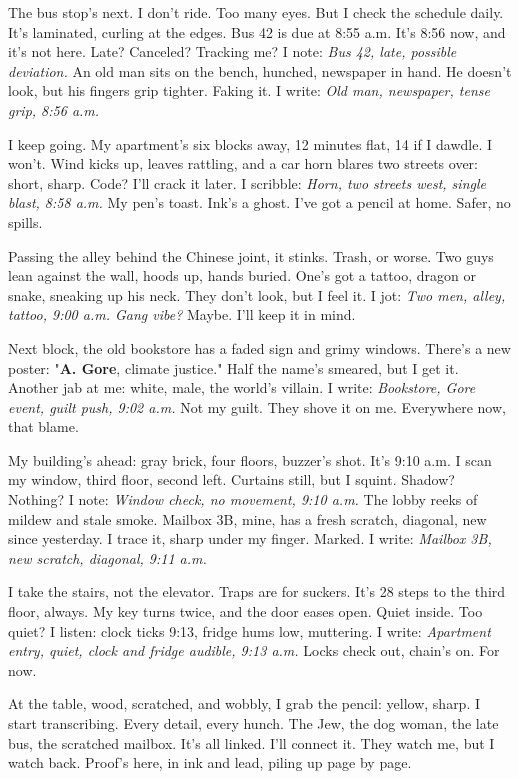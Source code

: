 \documentclass{article}
\begin{document}
The bus stop's next.  I don't ride. Too many eyes.  But I check the schedule daily. It's laminated, curling at the edges.  Bus 42 is due at 8:55 a.m. It's 8:56 now, and it's not here.  Late?  Canceled?  Tracking me? I note: \textit{Bus 42, late, possible deviation.} An old man sits on the bench, hunched, newspaper in hand. He doesn't look, but his fingers grip tighter. Faking it. I write: \textit{Old man, newspaper, tense grip, 8:56 a.m.}

I keep going. My apartment's six blocks away, 12 minutes flat, 14 if I dawdle. I won't. Wind kicks up, leaves rattling, and a car horn blares two streets over: short, sharp. Code? I'll crack it later. I scribble: \textit{Horn, two streets west, single blast, 8:58 a.m.} My pen's toast. Ink's a ghost. I've got a pencil at home. Safer, no spills.

Passing the alley behind the Chinese joint, it stinks. Trash, or worse. Two guys lean against the wall, hoods up, hands buried. One's got a tattoo, dragon or snake, sneaking up his neck. They don't look, but I feel it. I jot: \textit{Two men, alley, tattoo, 9:00 a.m. Gang vibe?} Maybe. I'll keep it in mind.

Next block, the old bookstore has a faded sign and grimy windows. There's a new poster: "\textbf{A. Gore}, climate justice." Half the name's smeared, but I get it. Another jab at me: white, male, the world's villain. I write: \textit{Bookstore, Gore event, guilt push, 9:02 a.m.} Not my guilt. They shove it on me. Everywhere now, that blame.

My building's ahead: gray brick, four floors, buzzer's shot. It's 9:10 a.m. I scan my window, third floor, second left. Curtains still, but I squint. Shadow? Nothing? I note: \textit{Window check, no movement, 9:10 a.m.} The lobby reeks of mildew and stale smoke. Mailbox 3B, mine, has a fresh scratch, diagonal, new since yesterday. I trace it, sharp under my finger. Marked. I write: \textit{Mailbox 3B, new scratch, diagonal, 9:11 a.m.}

I take the stairs, not the elevator. Traps are for suckers. It's 28 steps to the third floor, always. My key turns twice, and the door eases open. Quiet inside. Too quiet? I listen: clock ticks 9:13, fridge hums low, muttering. I write: \textit{Apartment entry, quiet, clock and fridge audible, 9:13 a.m.} Locks check out, chain's on. For now.

At the table, wood, scratched, and wobbly, I grab the pencil: yellow, sharp. I start transcribing. Every detail, every hunch. The Jew, the dog woman, the late bus, the scratched mailbox. It's all linked. I'll connect it. They watch me, but I watch back. Proof's here, in ink and lead, piling up page by page.
\end{document}
